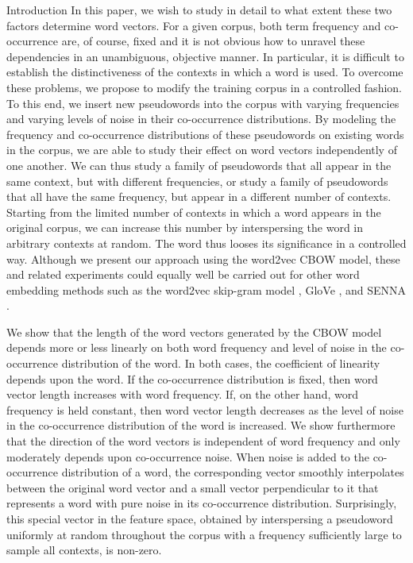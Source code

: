 \documentclass{article} %
\begin{document}
\begin{section}{Introduction}
In this paper, we wish to study in detail to what extent these two
factors determine word vectors.  For a given corpus, both term
frequency and co-occurrence are, of course, fixed and it is not obvious
how to unravel these dependencies in an unambiguous, objective manner.
In particular, it is difficult to establish the distinctiveness of the
contexts in which a word is used.  To overcome these problems, we
propose to modify the training corpus in a controlled fashion.  To
this end, we insert new pseudowords into the corpus with varying frequencies
and varying levels of noise in their co-occurrence distributions.  By
modeling the frequency and co-occurrence distributions of these pseudowords
on existing words in the corpus, we are able to study their effect on
word vectors independently of one another.  We can thus study a family
of pseudowords that all appear in the same context, but with different
frequencies, or study a family of pseudowords that all have the same
frequency, but appear in a different number of contexts.  Starting from
the limited number of contexts in which a word appears in the original
corpus, we can increase this number by interspersing the word in arbitrary
contexts at random.  The word thus looses its significance in a
controlled way.  Although we present our approach using the word2vec
CBOW model, these and related experiments could equally well be carried
out for other word embedding methods such as the word2vec skip-gram
model \cite{DistRepns,EfficientEstimation}, GloVe
\cite{pennington2014glove}, and SENNA \cite{collobert-2011}.

We show that the length of the word vectors generated by the CBOW model
depends more or less linearly on both word frequency and level of noise
in the co-occurrence distribution of the word.  In both cases, the
coefficient of linearity depends upon the word.  If the co-occurrence
distribution is fixed, then word vector length increases with word
frequency.  If, on the other hand, word frequency is held constant, then
word vector length decreases as the level of noise in the co-occurrence
distribution of the word is increased.  We show furthermore that the
direction of the word vectors is independent of word frequency and only
moderately depends upon co-occurrence noise.  When noise is added to the
co-occurrence distribution of a word, the corresponding vector smoothly
interpolates between the original word vector and a small vector
perpendicular to it that represents a word with pure noise in its
co-occurrence distribution.  Surprisingly, this special vector in the feature
space, obtained by interspersing a pseudoword uniformly at random throughout
the corpus with a frequency sufficiently large to sample all contexts, is
non-zero.


\end{section}
\end{document}
